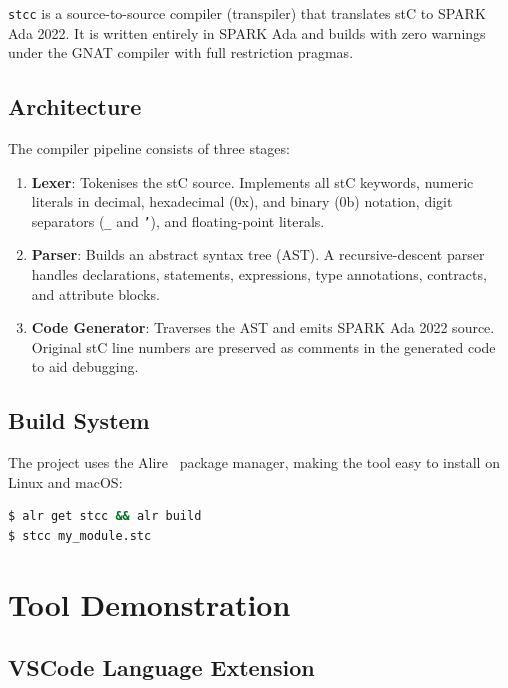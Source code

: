 \documentclass[runningheads]{llncs}
\begin{document}
\texttt{stcc} is a source-to-source compiler (transpiler) that translates stC
to SPARK Ada 2022. It is written entirely in SPARK Ada and builds
with zero warnings under the GNAT compiler with full restriction pragmas.

\subsection{Architecture}

The compiler pipeline consists of three stages:
\begin{enumerate}
  \item \textbf{Lexer}: Tokenises the stC source. Implements all stC keywords,
        numeric literals in decimal, hexadecimal (0x), and binary (0b) notation,
        digit separators (\texttt{\_} and \texttt{'}), and floating-point
        literals.
  \item \textbf{Parser}: Builds an abstract syntax tree (AST). A recursive-descent
        parser handles declarations, statements, expressions, type annotations,
        contracts, and attribute blocks.
  \item \textbf{Code Generator}: Traverses the AST and emits SPARK Ada 2022
        source. Original stC line numbers are preserved as comments in the
        generated code to aid debugging.
\end{enumerate}

\subsection{Build System}

The project uses the Alire~\cite{alire} package manager, making the tool
easy to install on Linux and macOS:

\begin{lstlisting}[language=sh, numbers=none]
$ alr get stcc && alr build
$ stcc my_module.stc
\end{lstlisting}

\section{Tool Demonstration}
\label{sec:demo}

\subsection{VSCode Language Extension}
\end{document}
